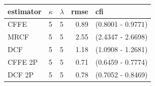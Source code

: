 \begin{tabular}{lllrl}
  \hline
estimator & $\kappa$ & $\lambda$ & rmse & cfi \\ 
  \hline
CFFE  & 5 & 5 & 0.89 & (0.8001 - 0.9771) \\ 
  MRCF  & 5 & 5 & 2.55 & (2.4347 - 2.6698) \\ 
  DCF  & 5 & 5 & 1.18 & (1.0908 - 1.2681) \\ 
  CFFE 2P  & 5 & 5 & 0.71 & (0.6459 - 0.7774) \\ 
  DCF 2P  & 5 & 5 & 0.78 & (0.7052 - 0.8469) \\ 
   \hline
\end{tabular}
